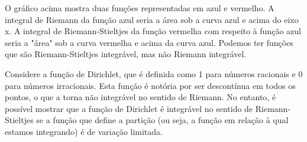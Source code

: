 \documentclass[analysis_notes.tex]{subfiles}
\begin{document}

O gráfico acima mostra duas funções representadas em azul e vermelho.
A integral de Riemann da função azul seria a área sob a curva azul e acima
do eixo x. A integral de Riemann-Stieltjes da função vermelha com respeito à função
azul seria a "área" sob a curva vermelha e acima da curva azul. Podemos ter fun\c cões
que são Riemann-Stieltjes integrável, mas não Riemann integrável.

Considere a função de Dirichlet, que é definida como 1 para números racionais
e 0 para números irracionais. Esta função é notória por ser descontínua em todos
os pontos, o que a torna não integrável no sentido de Riemann.
No entanto, é possível mostrar que a função de Dirichlet é integrável no sentido
de Riemann-Stieltjes se a função que define a partição
(ou seja, a função em relação à qual estamos integrando) é de variação limitada.
\end{document}
